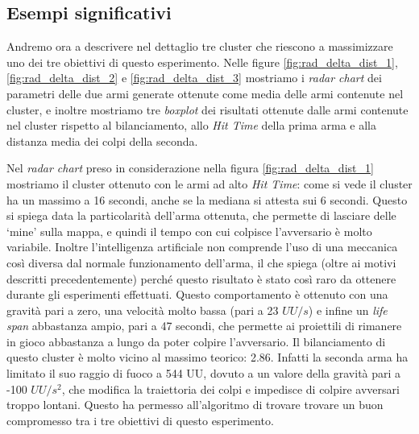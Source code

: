 \documentclass[12pt, italian]{toptesi}
\begin{document}
\subsection{Esempi significativi}

Andremo ora a descrivere nel dettaglio tre cluster che riescono a massimizzare uno dei tre obiettivi di questo esperimento.
Nelle figure \ref{fig:rad_delta_dist_1}, \ref{fig:rad_delta_dist_2} e \ref{fig:rad_delta_dist_3} mostriamo i \emph{radar chart} dei parametri delle due armi generate ottenute come media delle armi contenute nel cluster, e inoltre mostriamo tre \emph{boxplot} dei risultati ottenute dalle armi contenute nel cluster rispetto al bilanciamento, allo \emph{Hit Time} della prima arma e alla distanza media dei colpi della seconda.

Nel \emph{radar chart} preso in considerazione nella figura \ref{fig:rad_delta_dist_1} mostriamo il cluster ottenuto con le armi ad alto \emph{Hit Time}: come si vede il cluster ha un massimo a 16 secondi, anche se la mediana si attesta sui 6 secondi. Questo si spiega data la particolarità dell'arma ottenuta, che permette di lasciare delle `mine' sulla mappa, e quindi il tempo con cui colpisce l'avversario è molto variabile. Inoltre l'intelligenza artificiale non comprende l'uso di una meccanica così diversa dal normale funzionamento dell'arma, il che spiega (oltre ai motivi descritti precedentemente) perché questo risultato è stato così raro da ottenere durante gli esperimenti effettuati. Questo comportamento è ottenuto con una gravità pari a zero, una velocità molto bassa (pari a 23 $UU/s$) e infine un \emph{life span} abbastanza ampio, pari a 47 secondi, che permette ai proiettili di rimanere in gioco abbastanza a lungo da poter colpire l'avversario.
Il bilanciamento di questo cluster è molto vicino al massimo teorico: 2.86. Infatti la seconda arma ha limitato il suo raggio di fuoco a 544 UU, dovuto a un valore della gravità pari a -100 $UU/s^2$, che modifica la traiettoria dei colpi e impedisce di colpire avversari troppo lontani. Questo ha permesso all'algoritmo di trovare trovare un buon compromesso tra i tre obiettivi di questo esperimento.
\end{document}
